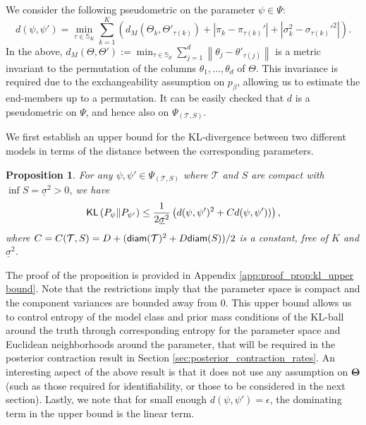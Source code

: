 \documentclass[bj,authoryear]{imsart}
\theoremstyle{plain}
\newtheorem{proposition}{Proposition}
\theoremstyle{remark}
\newtheorem{remark}{Remark}
\def\bTheta{{\boldsymbol\Theta}}
\def\bbS{\mathbb{S}}
\def\cT{\mathcal{T}}
\def\diam{{\sf diam}}
\def\KL{{\sf KL}}
\def\norm#1{\left\|#1\right\|}
\def\bTheta{\boldsymbol{\Theta}}
\begin{document}

 We consider the following pseudometric on the parameter $\psi\in \Psi$:
\begin{equation}
    \label{eq:bayes_metric}
    d(\psi, \psi') = \min_{\tau\in \bbS_K} \sum_{k=1}^K \left(d_M(\Theta_k, \Theta'_{\tau(k)}) + |\pi_k - \pi_{\tau(k)}'| + |\sigma_k^2 - \sigma_{\tau(k)}'^2|\right).
\end{equation}
In the above, $d_M(\Theta, \Theta') := \min_{\tau \in \bbS_d} \sum_{j=1}^d \norm{\theta_j - \theta'_{\tau(j)}}$ is a metric invariant to the permutation of the columns $\theta_1,\dots,\theta_d$ of $\Theta$. This invariance is required due to the exchangeability assumption on $p_\beta$, allowing us to estimate the end-members up to a permutation. 
It can be easily checked that $d$ is a pseudometric on $\Psi$, and hence also on $\Psi_{(\cT,S)}$. 

We first establish an upper bound for the KL-divergence between two different models in terms of the distance between the corresponding parameters.

\begin{proposition}\label{prop:kl_upper bound}
    For any $\psi, \psi'\in \Psi_{(\cT,S)}$ where $\cT$ and $S$ are compact with $\inf S = \underline{\sigma}^2>0$, we have
    \begin{align}
        \KL\left(P_{\psi}\Vert P_{\psi'}\right) \leq \frac{1}{2\underline{\sigma}^2}\left(d(\psi,\psi')^2 + C d(\psi,\psi'))\right),
    \end{align}
    where $C=C(\cT,S)=D + (\diam(\cT)^2 + D\diam(S))/2$ is a constant, free of $K$ and $\underline{\sigma}^2$.
\end{proposition}
The proof of the proposition is provided in Appendix \ref{app:proof_prop:kl_upper bound}. Note that the restrictions imply that the parameter space is compact and the component variances are bounded away from 0. This upper bound allows us to control entropy of the model class and prior mass conditions of the KL-ball around the truth through corresponding entropy for the parameter space and Euclidean neighborhoods around the parameter, that will be required in the posterior contraction result in Section \ref{sec:posterior_contraction_rates}. An interesting aspect of the above result is that it does not use any assumption on $\bTheta$ (such as those required for identifiability, or those to be considered in the next section). Lastly, we note that for small enough $d(\psi,\psi')=\epsilon$, the dominating term in the upper bound is the linear term.
\end{document}
